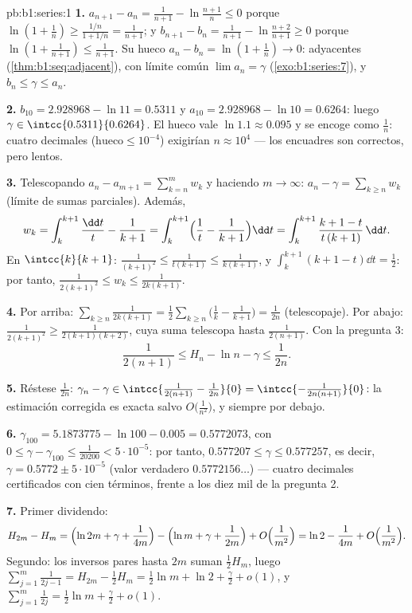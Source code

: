 \begin{solution}{pb:b1:series:1}
\textbf{1.} $a_{n+1} - a_n = \frac{1}{n+1} - \ln\frac{n+1}{n}
\leq 0$ porque $\ln(1 + \frac1n) \geq \frac{1/n}{1 + 1/n} =
\frac{1}{n+1}$; y $b_{n+1} - b_n = \frac{1}{n+1} -
\ln\frac{n+2}{n+1} \geq 0$ porque
$\ln(1 + \frac{1}{n+1}) \leq \frac{1}{n+1}$. Su hueco
$a_n - b_n = \ln(1 + \frac1n) \to 0$: adyacentes
(\cref{thm:b1:seq:adjacent}), con límite común
$\lim a_n = \gamma$ (\cref{exo:b1:series:7}), y
$b_n \leq \gamma \leq a_n$.

\textbf{2.} $b_{10} = 2.928968 - \ln 11 = 0.5311$ y
$a_{10} = 2.928968 - \ln 10 = 0.6264$: luego
$\gamma \in \intcc{0.5311}{0.6264}$. El hueco vale
$\ln 1.1 \approx 0.095$ y se encoge como $\frac1n$: cuatro decimales
($\text{hueco} \leq 10^{-4}$) exigirían $n \approx 10^4$ --- los
encuadres son correctos, pero lentos.

\textbf{3.} Telescopando $a_n - a_{m+1} = \sum_{k=n}^{m} w_k$ y
haciendo $m \to \infty$: $a_n - \gamma = \sum_{k\geq n} w_k$ (límite
de sumas parciales). Además,
\[
w_k = \int_k^{k+1} \frac{\dd t}{t} - \frac{1}{k+1}
= \int_k^{k+1} \Bigl(\frac1t - \frac{1}{k+1}\Bigr)\dd t
= \int_k^{k+1} \frac{k + 1 - t}{t\,(k+1)}\,\dd t .
\]
En $\intcc{k}{k+1}$: $\frac{1}{(k+1)^2} \leq \frac{1}{t(k+1)}
\leq \frac{1}{k(k+1)}$, y $\int_k^{k+1}(k + 1 - t)\dd t =
\frac12$: por tanto,
$\frac{1}{2(k+1)^2} \leq w_k \leq \frac{1}{2k(k+1)}$.

\textbf{4.} Por arriba:
$\sum_{k \geq n} \frac{1}{2k(k+1)} =
\frac12\sum_{k\geq n}\bigl(\frac1k - \frac{1}{k+1}\bigr) =
\frac{1}{2n}$ (telescopaje). Por abajo:
$\frac{1}{2(k+1)^2} \geq \frac{1}{2(k+1)(k+2)}$, cuya suma telescopa
hasta $\frac{1}{2(n+1)}$. Con la pregunta 3:
\[
\frac{1}{2(n+1)} \leq H_n - \ln n - \gamma \leq \frac{1}{2n} .
\]

\textbf{5.} Réstese $\frac{1}{2n}$:
$\gamma_n - \gamma \in \intcc{\frac{1}{2(n+1)} - \frac{1}{2n}}{0} =
\intcc{-\frac{1}{2n(n+1)}}{0}$: la estimación corregida es exacta
salvo $O\bigl(\frac{1}{n^2}\bigr)$, y siempre por debajo.

\textbf{6.} $\gamma_{100} = 5.1873775 - \ln 100 - 0.005 =
0.5772073$, con
$0 \leq \gamma - \gamma_{100} \leq \frac{1}{20200} < 5\cdot10^{-5}$:
por tanto, $0.577207 \leq \gamma \leq 0.577257$, es decir,
$\gamma = 0.5772 \pm 5\cdot10^{-5}$ (valor verdadero
$0.5772156\dots$) --- cuatro decimales certificados con cien
términos, frente a los diez mil de la pregunta 2.

\textbf{7.} Primer dividendo:
\[
H_{2m} - H_m = \Bigl(\ln 2m + \gamma + \frac{1}{4m}\Bigr)
- \Bigl(\ln m + \gamma + \frac{1}{2m}\Bigr) +
O\Bigl(\frac{1}{m^2}\Bigr)
= \ln 2 - \frac{1}{4m} + O\Bigl(\frac{1}{m^2}\Bigr).
\]
Segundo: los inversos pares hasta $2m$ suman $\frac12 H_m$, luego
$\sum_{j=1}^{m}\frac{1}{2j-1} = H_{2m} - \frac12 H_m = \frac12
\ln m + \ln 2 + \frac\gamma2 + o(1)$, y
$\sum_{j=1}^m \frac{1}{2j} = \frac12\ln m + \frac\gamma2 + o(1)$.


\end{solution}
